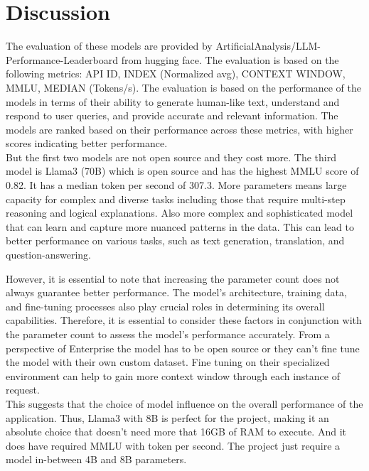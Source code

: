 \section{Discussion}

\noindent The evaluation of these models are provided by ArtificialAnalysis/LLM-Performance-Leaderboard from hugging face. The evaluation is based on the following metrics: API ID, INDEX (Normalized avg), CONTEXT WINDOW, MMLU, MEDIAN (Tokens/s). The evaluation is based on the performance of the models in terms of their ability to generate human-like text, understand and respond to user queries, and provide accurate and relevant information. The models are ranked based on their performance across these metrics, with higher scores indicating better performance.\\

\noindent But the first two models are not open source and they cost more. The third model is Llama3 (70B) which is open source and has the highest MMLU score of 0.82. It has a median token per second of 307.3. More parameters means large capacity for complex and diverse tasks including those that require multi-step reasoning and logical explanations. Also more complex and sophisticated model that can learn and capture more nuanced patterns in the data. This can lead to better performance on various tasks, such as text generation, translation, and question-answering. 

\noindent However, it is essential to note that increasing the parameter count does not always guarantee better performance. The model's architecture, training data, and fine-tuning processes also play crucial roles in determining its overall capabilities. Therefore, it is essential to consider these factors in conjunction with the parameter count to assess the model's performance accurately. From a perspective of Enterprise the model has to be open source or they can't fine tune the model with their own custom dataset. Fine tuning on their specialized environment can help to gain more context window through each instance of request.\\

\noindent This suggests that the choice of model influence on the overall performance of the application. Thus, Llama3 with 8B is perfect for the project, making it an absolute choice that doesn't need more that 16GB of RAM to execute. And it does have required MMLU with token per second. The project just require a model in-between 4B and 8B parameters.\\

\clearpage
% 